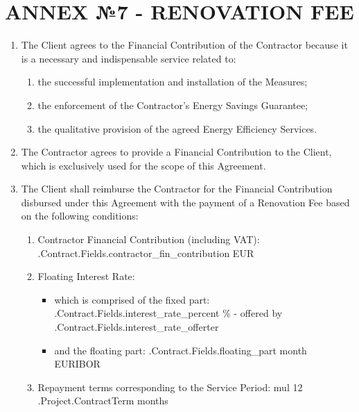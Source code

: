 \section{ANNEX №7 {-} RENOVATION FEE}

\begin{enumerate}[label=\arabic*.]
	\item The Client agrees to the Financial Contribution of the Contractor because it is a necessary and indispensable service related to:
	\begin{enumerate}
		\item the successful implementation and installation of the Measures;
		\item the enforcement of the Contractor’s Energy Savings Guarantee;
		\item the qualitative provision of the agreed Energy Efficiency Services.
	\end{enumerate}

	\item The Contractor agrees to provide a Financial Contribution to the Client, which is exclusively used for the scope of this Agreement.

	\item The Client shall reimburse the Contractor for the Financial Contribution disbursed under this Agreement with the payment of a Renovation Fee based on the following conditions:
	  \begin{enumerate}
		\item Contractor Financial Contribution (including VAT): \iffalse input fields.contractor_fin_contribution value="{{.Contract.Fields.contractor_fin_contribution}}" \fi {{.Contract.Fields.contractor_fin_contribution}} EUR
		\item Floating Interest Rate:
			\begin{itemize}
				\item which is comprised of the fixed part: \iffalse input fields.interest_rate_percent value="{{.Contract.Fields.interest_rate_percent}}" \fi {{.Contract.Fields.interest_rate_percent}} \% {-} offered by \iffalse input fields.interest_rate_offerter value="{{.Contract.Fields.interest_rate_offerter}}" \fi {{.Contract.Fields.interest_rate_offerter}}
				\item and the floating part: \iffalse input fields.floating_part value="{{.Contract.Fields.floating_part}}" \fi {{.Contract.Fields.floating_part}} month EURIBOR
			\end{itemize}
		\item Repayment terms corresponding to the Service Period: {{mul 12 .Project.ContractTerm}} months
	\end{enumerate}


\end{enumerate}
